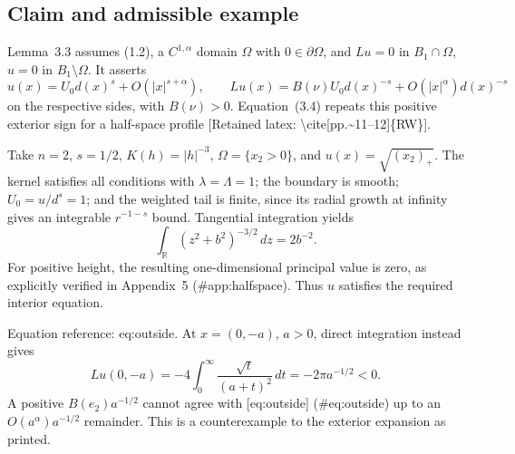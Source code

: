 \documentclass[10pt]{article}
\begin{document}
\subsection*{Claim and admissible example}
Lemma 3.3 assumes (1.2), a \(C^{1,\alpha}\) domain \(\Omega\) with \(0\in\partial\Omega\), and \(Lu=0\) in \(B_1\cap\Omega\), \(u=0\) in \(B_1\setminus\Omega\). It asserts \[u(x)=U_0d(x)^s+O(|x|^{s+\alpha}),\qquad
 Lu(x)=B(\nu)U_0d(x)^{-s}+O(|x|^\alpha)d(x)^{-s}\] on the respective sides, with \(B(\nu)>0\). Equation (3.4) repeats this positive exterior sign for a half-space profile [Retained latex: \textbackslash{}cite[pp.\textasciitilde{}11--12]\{RW\}].\par
Take \(n=2\), \(s=1/2\), \(K(h)=|h|^{-3}\), \(\Omega=\{x_2>0\}\), and \(u(x)=\sqrt{(x_2)_+}\). The kernel satisfies all conditions with \(\lambda=\Lambda=1\); the boundary is smooth; \(U_0=u/d^s=1\); and the weighted tail is finite, since its radial growth at infinity gives an integrable \(r^{-1-s}\) bound. Tangential integration yields \[\int_{\mathbb R}(z^2+b^2)^{-3/2}\,dz=2b^{-2}.\] For positive height, the resulting one-dimensional principal value is zero, as explicitly verified in Appendix 5 (\#app:halfspace). Thus \(u\) satisfies the required interior equation.\par
Equation reference: eq:outside. At \(x=(0,-a)\), \(a>0\), direct integration instead gives \[
 Lu(0,-a)=-4\int_0^\infty\frac{\sqrt t}{(a+t)^2}\,dt
        =-2\pi a^{-1/2}<0.\] A positive \(B(e_2)a^{-1/2}\) cannot agree with [eq:outside] (\#eq:outside) up to an \(O(a^\alpha)a^{-1/2}\) remainder. This is a counterexample to the exterior expansion as printed.\par
\end{document}
